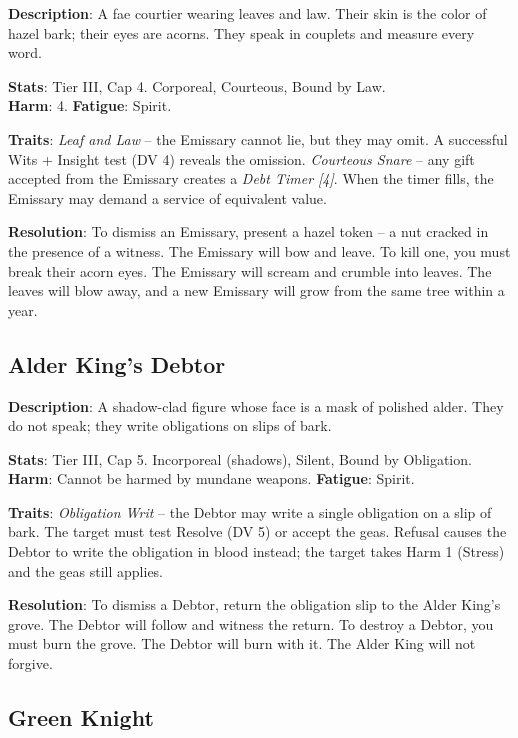 \noindent\textbf{Description}: A fae courtier wearing leaves and law. Their skin is the color of hazel bark; their eyes are acorns. They speak in couplets and measure every word.

\noindent\textbf{Stats}: Tier III, Cap 4. Corporeal, Courteous, Bound by Law.\\
\textbf{Harm}: 4. \textbf{Fatigue}: Spirit.

\noindent\textbf{Traits}: 
\emph{Leaf and Law} -- the Emissary cannot lie, but they may omit. A successful Wits + Insight test (DV 4) reveals the omission. \emph{Courteous Snare} -- any gift accepted from the Emissary creates a \emph{Debt Timer [4]}. When the timer fills, the Emissary may demand a service of equivalent value.

\noindent\textbf{Resolution}: To dismiss an Emissary, present a hazel token -- a nut cracked in the presence of a witness. The Emissary will bow and leave. To kill one, you must break their acorn eyes. The Emissary will scream and crumble into leaves. The leaves will blow away, and a new Emissary will grow from the same tree within a year.

\subsection*{Alder King's Debtor}

\noindent\textbf{Description}: A shadow-clad figure whose face is a mask of polished alder. They do not speak; they write obligations on slips of bark.

\noindent\textbf{Stats}: Tier III, Cap 5. Incorporeal (shadows), Silent, Bound by Obligation.\\
\textbf{Harm}: Cannot be harmed by mundane weapons. \textbf{Fatigue}: Spirit.

\noindent\textbf{Traits}: 
\emph{Obligation Writ} -- the Debtor may write a single obligation on a slip of bark. The target must test Resolve (DV 5) or accept the geas. Refusal causes the Debtor to write the obligation in blood instead; the target takes Harm 1 (Stress) and the geas still applies.

\noindent\textbf{Resolution}: To dismiss a Debtor, return the obligation slip to the Alder King's grove. The Debtor will follow and witness the return. To destroy a Debtor, you must burn the grove. The Debtor will burn with it. The Alder King will not forgive.

\subsection*{Green Knight}

